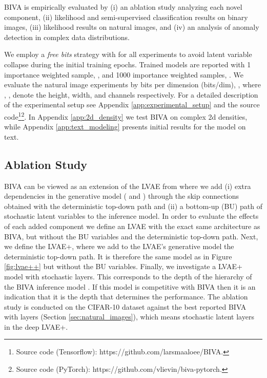 \documentclass{article}
\def\nm{BIVA\xspace}
\begin{document}
\nm is empirically evaluated by (i) an ablation study analyzing each novel component, (ii) likelihood and semi-supervised classification results on binary images, (iii) likelihood results on natural images, and (iv) an analysis of anomaly detection in complex data distributions. 
\iffalse
All trained models are optimized using Adamax \citep{Kingma14a} and weight normalization \citep{Salimans2016a}.  
\fi
We employ a \textit{free bits} strategy with  \citep{Kingma2016} for all experiments to avoid latent variable collapse during the initial training epochs.
Trained models are reported with 1 importance weighted sample, , and 1000 importance weighted samples,  \citep{Burda15a}. We evaluate the natural image experiments by bits per dimension (bits/dim), , where , ,  denote the height, width, and channels respectively.
For a detailed description of the experimental setup see Appendix \ref{app:experimental_setup} and the source code\footnote{Source code (Tensorflow): https://github.com/larsmaaloee/BIVA.}\footnote{Source code (PyTorch): https://github.com/vlievin/biva-pytorch.}.
In Appendix \ref{app:2d_density} we test \nm  on complex 2d densities, while Appendix \ref{app:text_modeling} presents initial results for the model on text. 


\subsection{Ablation Study}\label{sec:ablation}
\nm can be viewed as an extension of the LVAE from \citep{Sonderby2016} where we add (i) extra dependencies in the generative model ( and ) through the skip connections obtained with the deterministic top-down path and (ii) a bottom-up (BU) path of stochastic latent variables to the inference model. In order to evaluate the effects of each added component we define an LVAE with the exact same architecture as \nm, but without the BU variables and the deterministic top-down path. Next, we define the LVAE+, where we add to the LVAE's generative model the deterministic top-down path. It is therefore the same model as in Figure \ref{fig:lvae++} but without the BU variables. Finally, we investigate a LVAE+ model with  stochastic layers. This corresponds to the depth of the hierarchy of the \nm inference model . If this model is competitive with \nm then it is an indication that it is the depth that determines the performance. 
The ablation study is conducted on the CIFAR-10 dataset against the best reported \nm with  layers (Section \ref{sec:natural_images}), which means  stochastic latent layers in the deep LVAE+.
\end{document}
